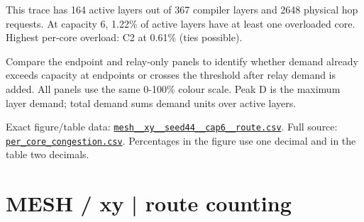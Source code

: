 \documentclass[10pt,a4paper]{article}
\begin{document}
This trace has 164 active layers out of 367 compiler layers and 2648 physical hop requests. At capacity 6, 1.22\% of active layers have at least one overloaded core. Highest per-core overload: C2 at 0.61\% (ties possible).\par
Compare the endpoint and relay-only panels to identify whether demand already exceeds capacity at endpoints or crosses the threshold after relay demand is added. All panels use the same 0-100\% colour scale. Peak D is the maximum layer demand; total demand sums demand units over active layers.\par
Exact figure/table data: \href{\detokenize{file:///home/dhruv-pansuriya/Documents/BTP/Compiler-Driven-ACE/output/pdf/qaoa_methods_congestion/tables/mesh__xy__seed44__cap6__route.csv}}{\nolinkurl{mesh__xy__seed44__cap6__route.csv}}. Full source: \href{\detokenize{file:///home/dhruv-pansuriya/Documents/BTP/Compiler-Driven-ACE/results/qaoa_2seed_2026-10-26/congestion/per_core_congestion.csv}}{\nolinkurl{per_core_congestion.csv}}. Percentages in the figure use one decimal and in the table two decimals.\par
\clearpage
\section*{MESH / xy | route counting}
\end{document}
